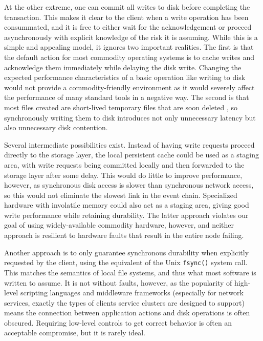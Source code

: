 At the other extreme, one can commit all writes to disk before completing the transaction. This makes it clear to the client when a write operation has been consummated, and it is free to either wait for the acknowledgement or proceed asynchronously with explicit knowledge of the risk it is assuming. While this is a simple and appealing model, it ignores two important realities. The first is that the default action for most commodity operating systems is to cache writes and acknowledge them immediately while delaying the disk write. Changing the expected performance characteristics of a basic operation like writing to disk would not provide a commodity-friendly environment as it would severely affect the performance of many standard tools in a negative way. The second is that most files created are short-lived temporary files that are soon deleted \cite{ousterhout}, so synchronously writing them to disk introduces not only unnecessary latency but also unnecessary disk contention.

Several intermediate possibilities exist. Instead of having write requests proceed directly to the storage layer, the local persistent cache could be used as a staging area, with write requests being committed locally and then forwarded to the storage layer after some delay. This would do little to improve performance, however, as synchronous disk access is slower than synchronous network access, so this would not eliminate the slowest link in the event chain. Specialized hardware with involatile memory could also act as a staging area, giving good write performance while retaining durability. The latter approach violates our goal of using widely-available commodity hardware, however, and neither approach is resilient to hardware faults that result in the entire node failing.

Another approach is to only guarantee synchronous durability when explicitly requested by the client, using the equivalent of the Unix \texttt{fsync()} system call. This matches the semantics of local file systems, and thus what most software is written to assume. It is not without faults, however, as the popularity of high-level scripting languages and middleware frameworks (especially for network services, exactly the types of clients service clusters are designed to support) means the connection between application actions and disk operations is often obscured. Requiring low-level controls to get correct behavior is often an acceptable compromise, but it is rarely ideal.

